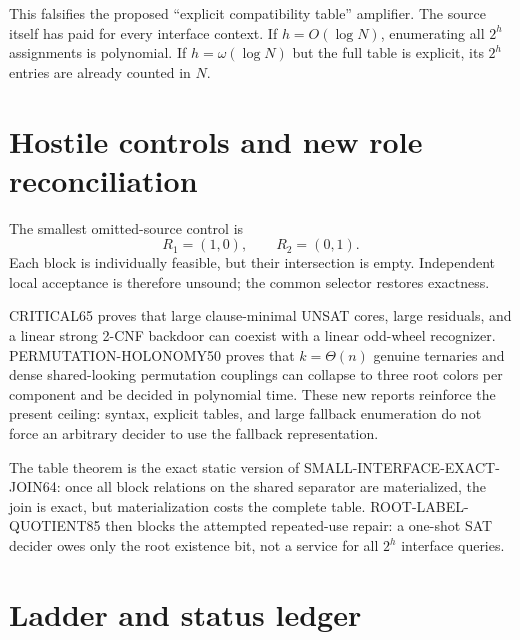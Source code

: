\documentclass[11pt]{article}
\begin{document}
This falsifies the proposed ``explicit compatibility table'' amplifier.
The source itself has paid for every interface context.  If $h=O(\log N)$,
enumerating all $2^h$ assignments is polynomial.  If $h=\omega(\log N)$ but
the full table is explicit, its $2^h$ entries are already counted in $N$.

\section{Hostile controls and new role reconciliation}

The smallest omitted-source control is
\[
R_1=(1,0),\qquad R_2=(0,1).
\]
Each block is individually feasible, but their intersection is empty.
Independent local acceptance is therefore unsound; the common selector
restores exactness.

CRITICAL65 proves that large clause-minimal UNSAT cores, large residuals,
and a linear strong 2-CNF backdoor can coexist with a linear odd-wheel
recognizer.  PERMUTATION-HOLONOMY50 proves that $k=\Theta(n)$ genuine
ternaries and dense shared-looking permutation couplings can collapse to
three root colors per component and be decided in polynomial time.  These
new reports reinforce the present ceiling: syntax, explicit tables, and
large fallback enumeration do not force an arbitrary decider to use the
fallback representation.

The table theorem is the exact static version of SMALL-INTERFACE-EXACT-JOIN64:
once all block relations on the shared separator are materialized, the join
is exact, but materialization costs the complete table.  ROOT-LABEL-QUOTIENT85
then blocks the attempted repeated-use repair: a one-shot SAT decider owes
only the root existence bit, not a service for all $2^h$ interface queries.

\section{Ladder and status ledger}
\end{document}
